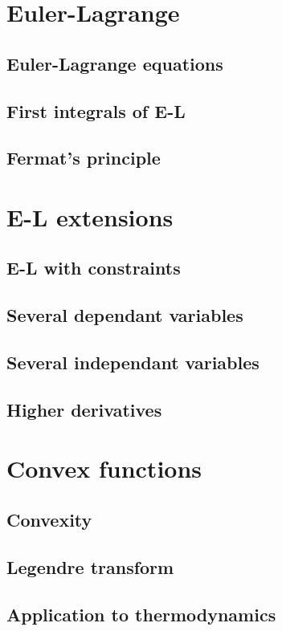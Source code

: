 \documentclass{article}
\begin{document}
\section{Euler-Lagrange}
\subsection{Euler-Lagrange equations}
\subsection{First integrals of E-L}
\subsection{Fermat's principle}

\section{E-L extensions}
\subsection{E-L with constraints}
\subsection{Several dependant variables}
\subsection{Several independant variables}
\subsection{Higher derivatives}

\section{Convex functions}
\subsection{Convexity}
\subsection{Legendre transform}
\subsection{Application to thermodynamics}
\end{document}
